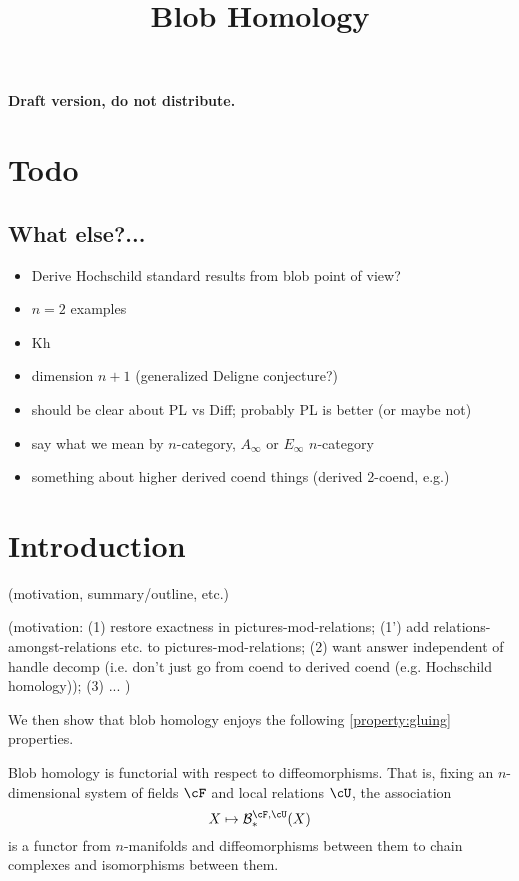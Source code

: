 \documentclass[11pt,leqno]{amsart}
\title{Blob Homology}
\def\bc{{\mathcal B}}
\begin{document}
\makeatletter
{}
\gdef\theequation{\thesection.\arabic{equation}}
\makeatother


\maketitle

\textbf{Draft version, do not distribute.}

\versioninfo

\section*{Todo}

\subsection*{What else?...}

\begin{itemize}
\item Derive Hochschild standard results from blob point of view?
\item $n=2$ examples
\item Kh
\item dimension $n+1$ (generalized Deligne conjecture?)
\item should be clear about PL vs Diff; probably PL is better
(or maybe not)
\item say what we mean by $n$-category, $A_\infty$ or $E_\infty$ $n$-category
\item something about higher derived coend things (derived 2-coend, e.g.)
\end{itemize}


\section{Introduction}

(motivation, summary/outline, etc.)

(motivation:
(1) restore exactness in pictures-mod-relations;
(1') add relations-amongst-relations etc. to pictures-mod-relations;
(2) want answer independent of handle decomp (i.e. don't
just go from coend to derived coend (e.g. Hochschild homology));
(3) ...
)



We then show that blob homology enjoys the following
\ref{property:gluing} properties.

\begin{property}[Functoriality]
\label{property:functoriality}%
Blob homology is functorial with respect to diffeomorphisms. That is, fixing an $n$-dimensional system of fields $\cF$ and local relations $\cU$, the association
\begin{equation*}
X \mapsto \bc_*^{\cF,\cU}(X)
\end{equation*}
is a functor from $n$-manifolds and diffeomorphisms between them to chain complexes and isomorphisms between them.
\end{property}
\end{document}
